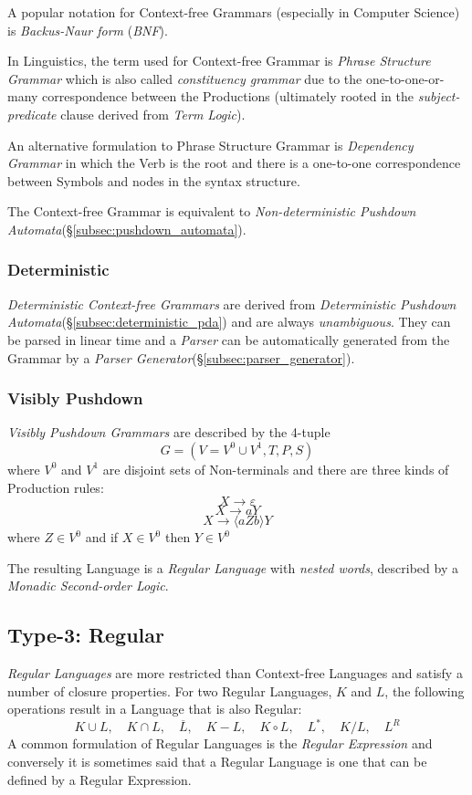 \documentclass{article}
\begin{document}
A popular notation for Context-free Grammars (especially in Computer
Science) is \emph{Backus-Naur form} (\emph{BNF}).

In Linguistics, the term used for Context-free Grammar is \emph{Phrase
  Structure Grammar} which is also called \emph{constituency grammar}
due to the one-to-one-or-many correspondence between the Productions
(ultimately rooted in the \emph{subject-predicate} clause derived from
\emph{Term Logic}).

An alternative formulation to Phrase Structure Grammar is \emph{Dependency
  Grammar} in which the Verb is the root and there is a one-to-one
correspondence between Symbols and nodes in the syntax structure.

The Context-free Grammar is equivalent to \emph{Non-deterministic
Pushdown Automata}(\S\ref{subsec:pushdown_automata}).

\subsubsection{Deterministic}\label{subsec:deterministic_cfg}
\emph{Deterministic Context-free Grammars} are derived from
\emph{Deterministic Pushdown Automata}(\S\ref{subsec:deterministic_pda})
and are always \emph{unambiguous}. They can be parsed in linear time
and a \emph{Parser} can be automatically generated from the Grammar by a
\emph{Parser Generator}(\S\ref{subsec:parser_generator}).

\subsubsection{Visibly Pushdown}
\emph{Visibly Pushdown Grammars} are described by the 4-tuple
\[
    G = (V=V^0 \cup V^1,T,P,S)
\]
where $V^0$ and $V^1$ are disjoint sets of Non-terminals and there
are three kinds of Production rules:
\[
    X \rightarrow \varepsilon
\]\[
    X \rightarrow aY
\]\[
    X \rightarrow \langle aZb \rangle Y
\]
where $Z \in V^0$ and if $X \in V^0$ then $Y \in V^0$

The resulting Language is a \emph{Regular Language} with \emph{nested
  words}, described by a \emph{Monadic Second-order Logic}. %

\subsection{Type-3: Regular} \label{subsec:regular_language}

\emph{Regular Languages} are more restricted than Context-free
Languages and satisfy a number of closure properties. For two Regular
Languages, $K$ and $L$, the following operations result in a Language
that is also Regular:
\[
    K \cup L, \quad
    K \cap L, \quad
    \overline{L}, \quad
    K - L, \quad
    K \circ L, \quad
    L^*, \quad
    K / L, \quad
    L^R
\]
A common formulation of Regular Languages is the \emph{Regular
  Expression} and conversely it is sometimes said that a Regular
Language is one that can be defined by a Regular Expression.
\end{document}
